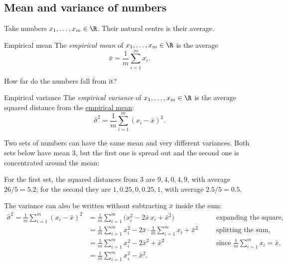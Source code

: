\documentclass[a4paper,12pt,oneside]{report}
\begin{document}
\subsection{Mean and variance of numbers}
\label{sec:mean-variance-numbers}

Take numbers $x_1,\ldots,x_m\in\R$. Their natural centre is their
average.

\begin{frameddefn}{Empirical mean}
\label{def:empirical-mean}
The \emph{empirical mean} of $x_1,\ldots,x_m\in\R$ is the average
\[
  \bar x=\frac1m\sum_{i=1}^{m}x_i .
\]
\end{frameddefn}

How far do the numbers fall from it?

\begin{frameddefn}{Empirical variance}
\label{def:empirical-variance}
The \emph{empirical variance} of $x_1,\ldots,x_m\in\R$ is the average
squared distance from the \hyperref[def:empirical-mean]{empirical mean}:
\[
  \hat\sigma^2=\frac1m\sum_{i=1}^{m}(x_i-\bar x)^2 .
\]
\end{frameddefn}

Two sets of numbers can have the same mean and very different
variances. Both sets below have mean $3$, but the first one is spread
out and the second one is concentrated around the mean:
\begin{center}
\end{center}
For the first set, the squared distances from $3$ are $9,4,0,4,9$, with
average $26/5=5.2$; for the second they are $1,0.25,0,0.25,1$, with
average $2.5/5=0.5$.

\label{eq:variance-mean-squares}The variance can also be written without subtracting $\bar x$ inside the
sum:
\[
\begin{aligned}
  \hat\sigma^2=\frac1m\sum_{i=1}^{m}(x_i-\bar x)^2
    &=\frac1m\sum_{i=1}^{m}\bigl(x_i^2-2\bar x\,x_i+\bar x^2\bigr)
      &&\quad\text{expanding the square},\\
    &=\frac1m\sum_{i=1}^{m}x_i^2
      -2\bar x\cdot\frac1m\sum_{i=1}^{m}x_i+\bar x^2
      &&\quad\text{splitting the sum},\\
    &=\frac1m\sum_{i=1}^{m}x_i^2-2\bar x^2+\bar x^2
      &&\quad\text{since } \frac1m\sum_{i=1}^{m}x_i=\bar x,\\
    &=\frac1m\sum_{i=1}^{m}x_i^2-\bar x^2 .
\end{aligned}
\]
\end{document}
